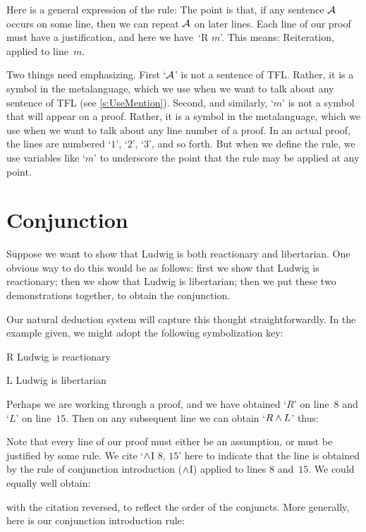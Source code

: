 Here is a general expression of the rule:
The point is that, if any sentence $\mathcal{A}$ occurs on some line,
then we can repeat $\mathcal{A}$ on later lines. Each line of our proof
must have a justification, and here we have~`R $m$'. This means:
Reiteration, applied to line~$m$.

Two things need emphasizing. First `$\mathcal{A}$' is not a sentence of
TFL. Rather, it is a symbol in the metalanguage, which we use when we
want to talk about any sentence of TFL (see \cref{s:UseMention}).
Second, and similarly, `$m$' is not a symbol that will appear on a
proof. Rather, it is a symbol in the metalanguage, which we use when
we want to talk about any line number of a proof. In an actual proof,
the lines are numbered `$1$', `$2$', `$3$', and so forth. But when we
define the rule, we use variables like `$m$' to underscore the point
that the rule may be applied at any point.

\section{Conjunction}
Suppose we want to show that Ludwig is both reactionary and libertarian. One obvious way to do this would be as follows: first we show that Ludwig is reactionary; then we show that Ludwig is libertarian; then we put these two demonstrations together, to obtain the conjunction.

Our natural deduction system will capture this thought straightforwardly. In the example given, we might adopt the following symbolization key:
	\begin{ekey}
		\item[R] Ludwig is reactionary
		\item[L] Ludwig is libertarian
	\end{ekey}
Perhaps we are working through a proof, and we have obtained `$R$' on
line~$8$ and `$L$' on line~$15$. Then on any subsequent line we can
obtain `$R \wedge L$' thus:
\begin{fitchproof}
	 
\end{fitchproof}
Note that every line of our proof must either be an assumption, or
must be justified by some rule. We cite `$\wedge$I $8$, $15$' here to
indicate that the line is obtained by the rule of conjunction
introduction ($\wedge$I) applied to lines $8$ and~$15$. We could
equally well obtain:
\begin{fitchproof}
	 
\end{fitchproof}
with the citation reversed, to reflect the order of the conjuncts. More generally, here is our conjunction introduction rule:

